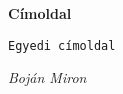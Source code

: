 \documentclass{book}
\begin{document}
\begin{titlepage}

\hspace{4cm}\LARGE\textbf{Címoldal}

\hspace{3cm}\vspace{1cm}\texttt{Egyedi címoldal}

\vspace{5cm}\hspace{3cm}\textit{Boján Miron}


\end{titlepage}
\end{document}
